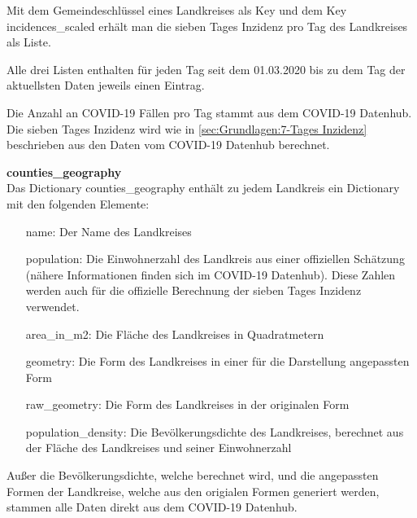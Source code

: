 Mit dem Gemeindeschlüssel eines Landkreises als Key und dem Key \glqq{}incidences\_scaled\grqq{} erhält man die sieben Tages Inzidenz pro Tag des Landkreises als Liste.

Alle drei Listen enthalten für jeden Tag seit dem 01.03.2020 bis zu dem Tag der aktuellsten Daten jeweils einen Eintrag.

Die Anzahl an COVID-19 Fällen pro Tag stammt aus dem \glqq{}COVID-19 Datenhub\grqq{}. Die sieben Tages Inzidenz wird wie in \autoref{sec:Grundlagen:7-Tages Inzidenz} beschrieben aus den Daten vom COVID-19 Datenhub berechnet.

\textbf{counties\_geography}\\
Das Dictionary counties\_geography enthält zu jedem Landkreis ein Dictionary mit den folgenden Elemente:
\begin{itemize}
    \item[name:] Der Name des Landkreises
    \item[population:] Die Einwohnerzahl des Landkreis aus einer offiziellen Schätzung (nähere Informationen finden sich im COVID-19 Datenhub). Diese Zahlen werden auch für die offizielle Berechnung der sieben Tages Inzidenz verwendet.
    \item[area\_in\_m2:] Die Fläche des Landkreises in Quadratmetern
    \item[geometry:] Die Form des Landkreises in einer für die Darstellung angepassten Form
    \item[raw\_geometry:] Die Form des Landkreises in der originalen Form
    \item[population\_density:] Die Bevölkerungsdichte des Landkreises, berechnet aus der Fläche des Landkreises und seiner Einwohnerzahl
\end{itemize}
Außer die Bevölkerungsdichte, welche berechnet wird, und die angepassten Formen der Landkreise, welche aus den origialen Formen generiert werden, stammen alle Daten direkt aus dem \glqq{}COVID-19 Datenhub\grqq{}.

